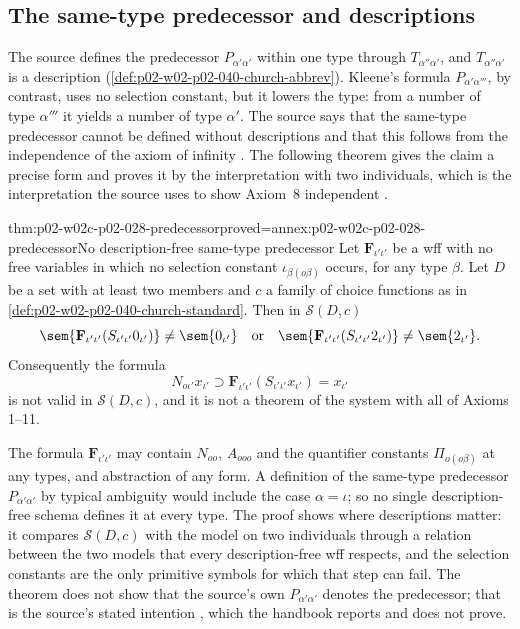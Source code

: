 \subsection{The same-type predecessor and descriptions}

The source defines the predecessor \(P_{\alpha'\alpha'}\) within one type
through \(T_{\alpha''\alpha'}\), and \(T_{\alpha''\alpha'}\) is a description
(\cref{def:p02-w02-p02-040-church-abbrev}).  Kleene's formula
\(P_{\alpha'\alpha'''}\), by contrast, uses no selection constant, but it
lowers the type: from a number of type \(\alpha'''\) it yields a number of
type \(\alpha'\).  The source says that the same-type predecessor cannot be
defined without descriptions and that this follows from the independence of
the axiom of infinity \cite[\S2, p.~59]{Church1940}.  The following theorem
gives the claim a precise form and proves it by the interpretation with two
individuals, which is the interpretation the source uses to show Axiom~8
independent \cite[\S4, p.~61]{Church1940}.

\begin{hbtheorem}{thm:p02-w02c-p02-028-predecessor}{proved=annex:p02-w02c-p02-028-predecessor}{No description-free same-type predecessor}
Let \(\mathbf F_{\iota'\iota'}\) be a wff with no free variables in which no
selection constant \(\iota_{\beta(o\beta)}\) occurs, for any type
\(\beta\).  Let \(D\) be a set with at least two members and \(c\) a family
of choice functions as in \cref{def:p02-w02-p02-040-church-standard}.  Then
in \(\mathcal S(D,c)\)
\[
 \sem{\mathbf F_{\iota'\iota'}(S_{\iota'\iota'}0_{\iota'})}\ne\sem{0_{\iota'}}
 \quad\text{or}\quad
 \sem{\mathbf F_{\iota'\iota'}(S_{\iota'\iota'}2_{\iota'})}\ne\sem{2_{\iota'}}.
\]
Consequently the formula
\[
 N_{o\iota'}x_{\iota'}\supset\mathbf F_{\iota'\iota'}(S_{\iota'\iota'}x_{\iota'})=x_{\iota'}
\]
is not valid in \(\mathcal S(D,c)\), and it is not a theorem of the system
with all of Axioms 1--11.
\end{hbtheorem}

The formula \(\mathbf F_{\iota'\iota'}\) may contain \(N_{oo}\),
\(A_{ooo}\) and the quantifier constants \(\Pi_{o(o\beta)}\) at any types,
and abstraction of any form.  A definition of the same-type predecessor
\(P_{\alpha'\alpha'}\) by typical ambiguity would include the case
\(\alpha=\iota\); so no single description-free schema defines it at every
type.  The proof shows where descriptions matter: it compares
\(\mathcal S(D,c)\) with the model on two individuals through a relation
between the two models that every description-free wff respects, and the
selection constants are the only primitive symbols for which that step can
fail.  The theorem does not show that the source's own
\(P_{\alpha'\alpha'}\) denotes the predecessor; that is the source's stated
intention \cite[\S2, p.~59]{Church1940}, which the handbook reports and does
not prove.

